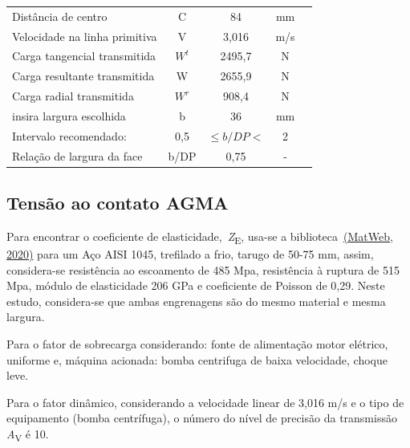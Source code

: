 \documentclass[12pt,a4paper]{article}
\begin{document}
\begin{table}[!htb]
\begin{tabular}{l c c c c}
Distância de centro                     & C                & 84              & mm             \\
Velocidade na linha primitiva           & V                & 3,016           & m/s            \\
Carga tangencial transmitida            & $W^t$            & 2495,7          & N              \\
Carga resultante transmitida            & W                & 2655,9          & N              \\
Carga radial transmitida                & $W^r$            & 908,4           & N              \\
insira largura escolhida                & b                & 36              & mm             \\ \hline
Intervalo recomendado:                  & 0,5              &$\leq b/DP<$     & 2              \\ \hline
Relação de largura da face              & b/DP             & 0,75            & -              \\ \hline
\end{tabular}
\end{table}

\subsection*{}

{\label{tensuxe3o-ao-contato-agma}}

\subsection*{Tensão ao contato AGMA}

{\label{tensuxe3o-ao-contato-agma}}

Para encontrar o coeficiente de elasticidade,~\emph{Z}\textsubscript{E},
usa-se a biblioteca~\hyperref[csl:29]{(MatWeb, 2020)} para um Aço AISI 1045, trefilado
a frio, tarugo de 50-75 mm, assim, considera-se resistência ao
escoamento de 485 Mpa, resistência à ruptura de 515 Mpa, módulo de
elasticidade 206 GPa e coeficiente de Poisson de 0,29. Neste estudo,
considera-se que ambas engrenagens são do mesmo material e mesma
largura.

Para o fator de sobrecarga considerando: fonte de alimentação motor
elétrico, uniforme e, máquina acionada: bomba centrifuga de baixa
velocidade, choque leve.

Para o fator dinâmico, considerando a velocidade linear de 3,016 m/s e o
tipo de equipamento (bomba centrífuga), o número do nível de precisão da
transmissão \emph{A}\textsubscript{V} é 10.
\end{document}
